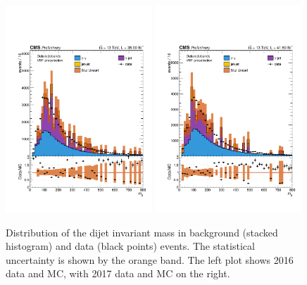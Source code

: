 \begin{figure}
  \centering
  \includegraphics[width=0.49\textwidth]{Figures/Categorisation/mjj_2016.pdf}
  \includegraphics[width=0.49\textwidth]{Figures/Categorisation/mjj_2017.pdf}
  \caption[Dijet invariant mass distributions.]
  {
    Distribution of the dijet invariant mass in background (stacked histogram) 
    and data (black points) events.
    The statistical uncertainty is shown by the orange band.
    The left plot shows 2016 data and MC,
    with 2017 data and MC on the right.
  }
  \label{fig:cat_mjjinput}
\end{figure}

